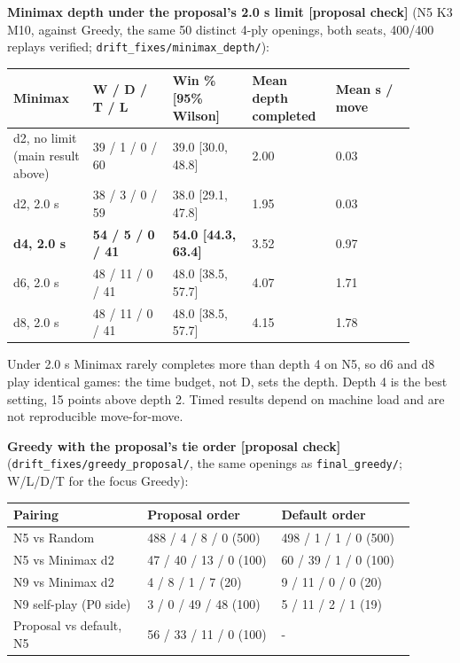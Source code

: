 \documentclass[11pt]{article}
\begin{document}
\textbf{Minimax depth under the proposal's 2.0 s limit [proposal check]} (N5 K3 M10, against Greedy,
the same 50 distinct 4-ply openings, both seats, 400/400 replays verified;
\texttt{drift\_fixes/minimax\_depth/}):

\begin{center}\scriptsize
\begin{longtable}{p{0.18\linewidth}p{0.18\linewidth}p{0.18\linewidth}p{0.18\linewidth}p{0.18\linewidth}}
\toprule
Minimax & W / D / T / L & Win \% [95\% Wilson] & Mean depth completed & Mean s / move \\
\midrule
d2, no limit (main result above) & 39 / 1 / 0 / 60 & 39.0 [30.0, 48.8] & 2.00 & 0.03 \\
d2, 2.0 s & 38 / 3 / 0 / 59 & 38.0 [29.1, 47.8] & 1.95 & 0.03 \\
\textbf{d4, 2.0 s} & \textbf{54 / 5 / 0 / 41} & \textbf{54.0 [44.3, 63.4]} & 3.52 & 0.97 \\
d6, 2.0 s & 48 / 11 / 0 / 41 & 48.0 [38.5, 57.7] & 4.07 & 1.71 \\
d8, 2.0 s & 48 / 11 / 0 / 41 & 48.0 [38.5, 57.7] & 4.15 & 1.78 \\
\bottomrule
\end{longtable}
\end{center}

Under 2.0 s Minimax rarely completes more than depth 4 on N5, so d6 and d8 play identical games:
the time budget, not D, sets the depth. Depth 4 is the best setting, 15 points above depth 2.
Timed results depend on machine load and are not reproducible move-for-move.

\textbf{Greedy with the proposal's tie order [proposal check]} (\texttt{drift\_fixes/greedy\_proposal/}, the
same openings as \texttt{final\_greedy/}; W/L/D/T for the focus Greedy):

\begin{center}\scriptsize
\begin{longtable}{p{0.30\linewidth}p{0.30\linewidth}p{0.30\linewidth}}
\toprule
Pairing & Proposal order & Default order \\
\midrule
N5 vs Random & 488 / 4 / 8 / 0 (500) & 498 / 1 / 1 / 0 (500) \\
N5 vs Minimax d2 & 47 / 40 / 13 / 0 (100) & 60 / 39 / 1 / 0 (100) \\
N9 vs Minimax d2 & 4 / 8 / 1 / 7 (20) & 9 / 11 / 0 / 0 (20) \\
N9 self-play (P0 side) & 3 / 0 / 49 / 48 (100) & 5 / 11 / 2 / 1 (19) \\
Proposal vs default, N5 & 56 / 33 / 11 / 0 (100) & - \\
\bottomrule
\end{longtable}
\end{center}
\end{document}
